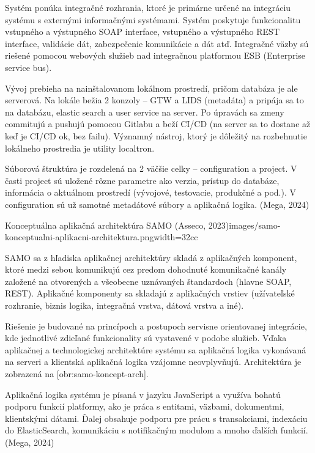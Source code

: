Systém ponúka integračné rozhrania, ktoré je primárne určené na integráciu systému s externými informačnými systémami. Systém poskytuje funkcionalitu vstupného a výstupného SOAP interface, vstupného a výstupného REST interface, validácie dát, zabezpečenie komunikácie a dát atď. Integračné väzby sú riešené pomocou webových služieb nad integračnou platformou ESB (Enterprise service bus). 

Vývoj prebieha na nainštalovanom lokálnom prostredí, pričom databáza je ale serverová. Na lokále bežia 2 konzoly -- GTW a LIDS (metadáta) a pripája sa to na databázu, elastic search a user service na server. Po úpravách sa zmeny commitujú a pushujú pomocou Gitlabu a beží CI/CD (na server sa to dostane až keď je CI/CD ok, bez failu). Významný nástroj, ktorý je dôležitý na rozbehnutie lokálneho prostredia je utility localtron. 

Súborová štruktúra je rozdelená na 2 väčšie celky -- configuration a project. V časti project sú uložené rôzne parametre ako verzia, prístup do databáze, informácia o aktuálnom prostredí (vývojové, testovacie, produkčné a pod.). V configuration sú už samotné metadátové súbory a aplikačná logika. (Mega, 2024)

{Konceptuálna aplikačná architektúra SAMO (Asseco, 2023)}{images/samo-konceptualni-aplikacni-architektura.png}{width=32cc}

SAMO sa z hľadiska aplikačnej architektúry skladá z aplikačných komponent, ktoré medzi sebou komunikujú cez predom dohodnuté komunikačné kanály založené na otvorených a všeobecne uznávaných štandardoch (hlavne SOAP, REST). Aplikačné komponenty sa skladajú z aplikačných vrstiev (užívateľské rozhranie, biznis logika, integračná vrstva, dátová vrstva a iné).

Riešenie je budované na princípoch a postupoch servisne orientovanej integrácie, kde jednotlivé zdieľané funkcionality sú vystavené v podobe služieb. Vďaka aplikačnej a technologickej architektúre systému sa aplikačná logika vykonávaná na serveri a klientská aplikačná logika vzájomne neovplyvňujú. Architektúra je zobrazená na [obr:samo-koncept-arch].

Aplikačná logika systému je písaná v jazyku JavaScript a využíva bohatú podporu funkcií platformy, ako je práca s entitami, väzbami, dokumentmi, klientskými dátami. Ďalej obsahuje podporu pre prácu s transakciami, indexáciu do ElasticSearch, komunikáciu s notifikačným modulom a mnoho ďalších funkcií. \scr(Mega, 2024)


